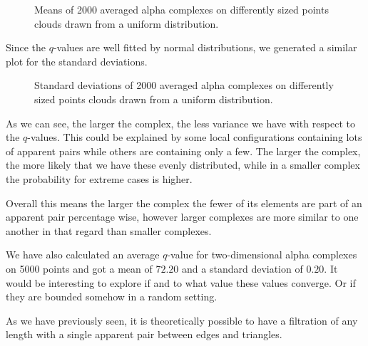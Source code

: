 \begin{figure}[H]
\begin{subfigure}[c]{0.95\textwidth}
\begin{center}

\end{center}
\end{subfigure}
\caption{Means of 2000 averaged alpha complexes on differently sized points clouds drawn from a uniform distribution.}
\label{fig:2d_means}
\end{figure}

Since the $q$-values are well fitted by normal distributions, we generated a similar plot for the standard deviations.

\begin{figure}[H]
\begin{subfigure}[c]{0.95\textwidth}
\begin{center}

\end{center}
\end{subfigure}
\caption{Standard deviations of 2000 averaged alpha complexes on differently sized points clouds drawn from a uniform distribution.}
\label{fig:2d_stds}
\end{figure}

As we can see, the larger the complex, the less variance we have with respect to the $q$-values. This could be explained by some local configurations containing lots of apparent pairs while others are containing only a few. The larger the complex, the more likely that we have these evenly distributed, while in a smaller complex the probability for extreme cases is higher. 

Overall this means the larger the complex the fewer of its elements are part of an apparent pair percentage wise, however larger complexes are more similar to one another in that regard than smaller complexes.

We have also calculated an average $q$-value for two-dimensional alpha complexes on 5000 points and got a mean of $72.20$ and a standard deviation of $0.20$. It would be interesting to explore if and to what value these values converge. Or if they are bounded somehow in a random setting. 

As we have previously seen, it is theoretically possible to have a filtration of any length with a single apparent pair between edges and triangles. 

